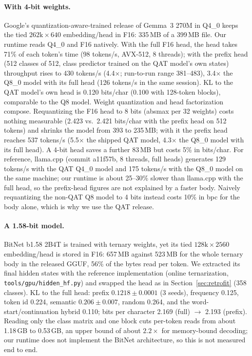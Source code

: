 \documentclass[11pt]{article}
\begin{document}
\paragraph{With 4-bit weights.} Google's quantization-aware-trained release of Gemma~3 270M in Q4\_0 keeps the tied $262\text{k}\times640$ embedding/head in F16: 335\,MB of a 399\,MB file. Our runtime reads Q4\_0 and F16 natively. With the full F16 head, the head takes 71\% of each token's time (98 tokens/s, AVX-512, 8 threads); with the prefix head (512 classes of 512, class predictor trained on the QAT model's own states) throughput rises to 430 tokens/s (4.4$\times$; run-to-run range 381--483), 3.4$\times$ the Q8\_0 model with its full head (126 tokens/s in the same session). KL to the QAT model's own head is 0.120 bits/char (0.100 with 128-token blocks), comparable to the Q8 model. Weight quantization and head factorization compose. Requantizing the F16 head to 8 bits (absmax per 32 weights) costs nothing measurable (2.423 vs.\ 2.421 bits/char with the prefix head on 512 tokens) and shrinks the model from 393 to 235\,MB; with it the prefix head reaches 537 tokens/s (5.5$\times$ the shipped QAT model, 4.3$\times$ the Q8\_0 model with its full head). A 4-bit head saves a further 83\,MB but costs 5\% in bits/char. For reference, llama.cpp (commit a11f57b, 8 threads, full heads) generates 129 tokens/s with the QAT Q4\_0 model and 175 tokens/s with the Q8\_0 model on the same machine; our runtime is about 25--30\% slower than llama.cpp with the full head, so the prefix-head figures are not explained by a faster body. Naively requantizing the non-QAT Q8 model to 4 bits instead costs 10\% in bpc for the body alone, which is why we use the QAT release.

\paragraph{A 1.58-bit model.} BitNet b1.58 2B4T \citep{bitnet2025} is trained with ternary weights, yet its tied $128\text{k}\times2560$ embedding/head is stored in F16: 657\,MB against 523\,MB for the whole ternary body in the released GGUF, 56\% of the bytes read per token. We extracted its final hidden states with the reference implementation (online ternarization, \texttt{tools/gpu/hidden\_hf.py}) and swapped the head as in Section~\ref{sec:retrofit} (358 classes). KL to the full head: prefix $0.1218\pm0.0001$ (3 seeds), frequency 0.125, token id 0.224, semantic $0.206\pm0.007$, random 0.264, and the word-start/continuation hybrid 0.110; bits per character 2.169 (full) $\to$ 2.193 (prefix). Reading only the class matrix and one block cuts per-token reads from about 1.18\,GB to 0.53\,GB, an upper bound of about $2.2\times$ for memory-bound decoding; our runtime does not implement the BitNet architecture, so this is not measured end to end.
\end{document}
